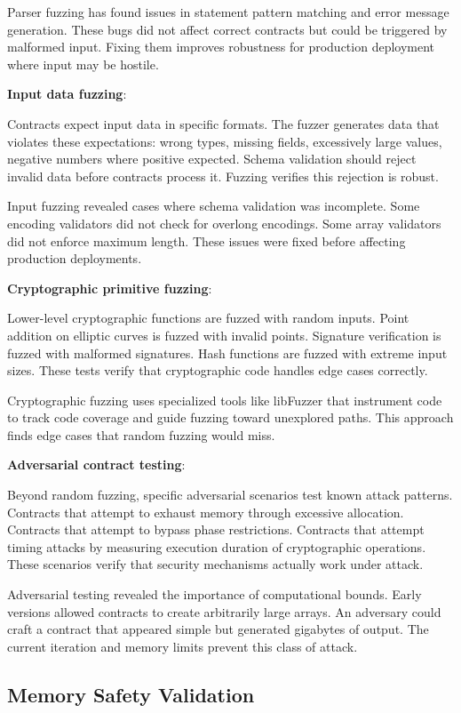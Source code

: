 Parser fuzzing has found issues in statement pattern matching and
error message generation. These bugs did not affect correct contracts
but could be triggered by malformed input. Fixing them improves
robustness for production deployment where input may be hostile.

\textbf{Input data fuzzing}:

Contracts expect input data in specific formats. The fuzzer generates
data that violates these expectations: wrong types, missing fields,
excessively large values, negative numbers where positive
expected. Schema validation should reject invalid data before
contracts process it. Fuzzing verifies this rejection is robust.

Input fuzzing revealed cases where schema validation was
incomplete. Some encoding validators did not check for overlong
encodings. Some array validators did not enforce maximum length. These
issues were fixed before affecting production deployments.

\textbf{Cryptographic primitive fuzzing}:

Lower-level cryptographic functions are fuzzed with random
inputs. Point addition on elliptic curves is fuzzed with invalid
points. Signature verification is fuzzed with malformed
signatures. Hash functions are fuzzed with extreme input sizes. These
tests verify that cryptographic code handles edge cases correctly.

Cryptographic fuzzing uses specialized tools like libFuzzer that
instrument code to track code coverage and guide fuzzing toward
unexplored paths. This approach finds edge cases that random fuzzing
would miss.

\textbf{Adversarial contract testing}:

Beyond random fuzzing, specific adversarial scenarios test known
attack patterns. Contracts that attempt to exhaust memory through
excessive allocation. Contracts that attempt to bypass phase
restrictions. Contracts that attempt timing attacks by measuring
execution duration of cryptographic operations. These scenarios verify
that security mechanisms actually work under attack.

Adversarial testing revealed the importance of computational
bounds. Early versions allowed contracts to create arbitrarily large
arrays. An adversary could craft a contract that appeared simple but
generated gigabytes of output. The current iteration and memory limits
prevent this class of attack.

\subsection{Memory Safety Validation}

